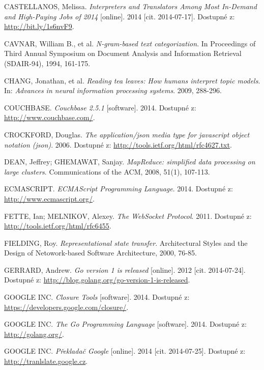 \begin{thebibliography}{99}
  CASTELLANOS, Melissa. \textit{Interpreters and Translators Among Most In-Demand and High-Paying Jobs of 2014} [online]. 2014 [cit. 2014-07-17].
  Dostupné z: \url{http://bit.ly/1s6nvF9}.

  CAVNAR, William B., et al. \textit{N-gram-based text categorization}.
  In Proceedings of Third Annual Symposium on Document Analysis and Information Retrieval (SDAIR-94), 1994, 161-175.

  CHANG, Jonathan, et al. \textit{Reading tea leaves: How humans interpret topic models}. In: \textit{Advances in neural information processing systems}. 2009, 288-296.

  COUCHBASE. \textit{Couchbase 2.5.1} [software]. 2014.
  Dostupné z: \url{http://www.couchbase.com/}.

  CROCKFORD, Douglas. \textit{The application/json media type for javascript object notation (json)}. 2006.
  Dostupné z: \url{http://tools.ietf.org/html/rfc4627.txt}.

  DEAN, Jeffrey; GHEMAWAT, Sanjay. \textit{MapReduce: simplified data processing on large clusters}. Communications of the ACM, 2008, 51(1), 107-113.

  ECMASCRIPT. \textit{ECMAScript Programming Language}. 2014.
  Dostupné z: \url{http://www.ecmascript.org/}.

  FETTE, Ian; MELNIKOV, Alexey. \textit{The WebSocket Protocol}. 2011.
  Dostupné z: \url{http://tools.ietf.org/html/rfc6455}.

  FIELDING, Roy. \textit{Representational state transfer}. Architectural Styles and the Design of Netowork-based Software Architecture, 2000, 76-85.

  GERRARD, Andrew.
  \emph{Go version 1 is released} [online]. 2012 [cit. 2014-07-24].
  Dostupné z: \url{http://blog.golang.org/go-version-1-is-released}.

  GOOGLE INC. \textit{Closure Tools} [software]. 2014.
  Dostupné z: \url{https://developers.google.com/closure/}.

  GOOGLE INC. \textit{The Go Programming Language} [software]. 2014.
  Dostupné z: \url{http://golang.org/}.

  GOOGLE INC. \textit{Překladač Google} [online]. 2014 [cit. 2014-07-25].
  Dostupné z: \url{http://tranlslate.google.cz}.


\end{thebibliography}
